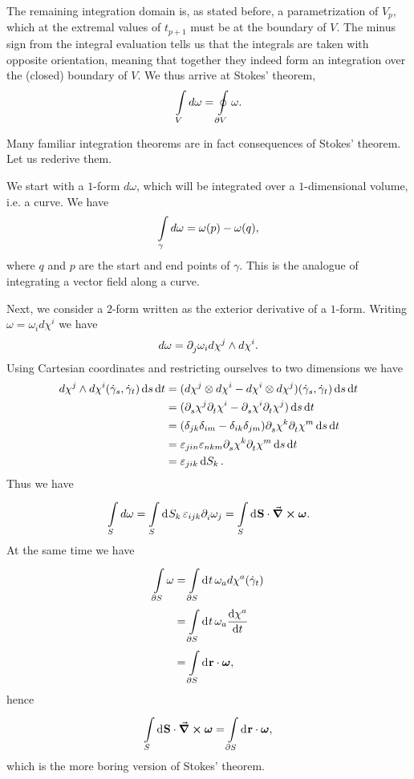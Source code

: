 The remaining integration domain is, as stated before, a parametrization of $V_{p}$, which at the extremal values of $t_{p + 1}$ must be at the boundary of $V$. The minus sign from the integral evaluation tells us that the integrals are taken with opposite orientation, meaning that together they indeed form an integration over the (closed) boundary of $V$. We thus arrive at Stokes' theorem,
\begin{align*}
\int\limits_{V}d\omega = \oint\limits_{\partial V}\omega.
\end{align*}

Many familiar integration theorems are in fact consequences of Stokes' theorem. Let us rederive them.

We start with a $1$-form $d\omega$, which will be integrated over a $1$-dimensional volume, i.e. a curve. We have
\begin{align*}
\int\limits_{\gamma}d\omega = \omega(p) - \omega(q),
\end{align*}
where $q$ and $p$ are the start and end points of $\gamma$. This is the analogue of integrating a vector field along a curve.

Next, we consider a $2$-form written as the exterior derivative of a $1$-form. Writing $\omega = \omega_{i}d\chi^{i}$ we have
\begin{align*}
d\omega = \partial^{}_{j}\omega_{i}d\chi^{j}\wedge d\chi^{i}.
\end{align*}
Using Cartesian coordinates and restricting ourselves to two dimensions we have
\begin{align*}
d\chi^{j}\wedge d\chi^{i}(\dot{\gamma}_{s}, \dot{\gamma}_{t})\dd{s}\dd{t} &= (d\chi^{j}\otimes d\chi^{i} - d\chi^{i}\otimes d\chi^{j})(\dot{\gamma}_{s}, \dot{\gamma}_{t})\dd{s}\dd{t} \\
&= (\partial^{}_{s}\chi^{j}\partial^{}_{t}\chi^{i} - \partial^{}_{s}\chi^{i}\partial^{}_{t}\chi^{j})\dd{s}\dd{t} \\
&= (\delta_{jk}\delta_{im} - \delta_{ik}\delta_{jm})\partial^{}_{s}\chi^{k}\partial^{}_{t}\chi^{m}\dd{s}\dd{t} \\
&= \varepsilon_{jin}\varepsilon_{nkm}\partial^{}_{s}\chi^{k}\partial^{}_{t}\chi^{m}\dd{s}\dd{t} \\
&= \varepsilon_{jik}\dd{S_{k}}.
\end{align*}
Thus we have
\begin{align*}
\int\limits_{S}d\omega = \int\limits_{S}^{}\dd[]{S_{k}}\varepsilon_{ijk}\partial^{}_{i}\omega_{j} = \int\limits_{S}^{}\dd[]{\vb{S}}\cdot\curl{\vb*{\omega}}.
\end{align*}
At the same time we have
\begin{align*}
\int\limits_{\partial S}\omega &= \int\limits_{\partial S}^{}\dd[]{t}\omega_{a}d\chi^{a}(\dot{\gamma}_{t}) \\
&= \int\limits_{\partial S}^{}\dd[]{t}\omega_{a}\dv{\chi^{a}}{t} \\
&= \int\limits_{\partial S}^{}\dd[]{\vb{r}}\cdot\vb*{\omega},
\end{align*}
hence
\begin{align*}
\int\limits_{S}^{}\dd[]{\vb{S}}\cdot\curl{\vb*{\omega}} = \int\limits_{\partial S}^{}\dd[]{\vb{r}}\cdot\vb*{\omega},
\end{align*}
which is the more boring version of Stokes' theorem.

